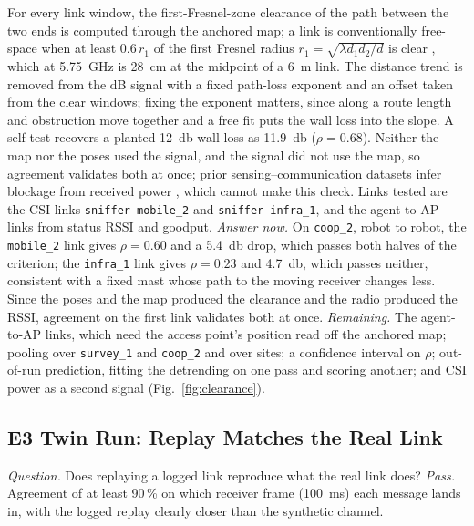 \documentclass[journal]{IEEEtran}
\begin{document}
For every link window, the first-Fresnel-zone clearance of the path
between the two ends is computed through the anchored map; a link is
conventionally free-space when at least $0.6\,r_1$ of the first
Fresnel radius $r_1 = \sqrt{\lambda d_1 d_2 / d}$ is clear
\cite{itup530}, which at \SI{5.75}{\giga\hertz} is \SI{28}{\centi\metre}
at the midpoint of a \SI{6}{\metre} link. The distance trend is
removed from the dB signal with a fixed path-loss exponent and an
offset taken from the clear windows; fixing the exponent matters,
since along a route length and obstruction move together and a free
fit puts the wall loss into the slope. A self-test recovers a planted
\SI{12}{\decibel} wall loss as \SI{11.9}{\decibel} ($\rho = 0.68$).
Neither the map nor the poses used the signal, and the signal did not
use the map, so agreement validates both at once; prior
sensing--communication datasets infer blockage from received power
\cite{deepsense6g}, which cannot make this check. Links tested are
the CSI links \texttt{sniffer}--\texttt{mobile\_2} and
\texttt{sniffer}--\texttt{infra\_1}, and the agent-to-AP links from
status RSSI and goodput. \emph{Answer now.} On \texttt{coop\_2}, robot to robot, the
\texttt{mobile\_2} link gives $\rho = 0.60$ and a
\SI{5.4}{\decibel} drop, which passes both halves of the criterion;
the \texttt{infra\_1} link gives $\rho = 0.23$ and
\SI{4.7}{\decibel}, which passes neither, consistent with a fixed
mast whose path to the moving receiver changes less. Since the poses
and the map produced the clearance and the radio produced the RSSI,
agreement on the first link validates both at once.
\emph{Remaining.} The agent-to-AP links, which need the access
point's position read off the anchored map; pooling over
\texttt{survey\_1} and \texttt{coop\_2} and over sites; a
confidence interval on $\rho$; out-of-run prediction, fitting the
detrending on one pass and scoring another; and CSI power as a second
signal (Fig.~\ref{fig:clearance}).





\subsection{E3 Twin Run: Replay Matches the Real Link}
\emph{Question.} Does replaying a logged link reproduce what the real
link does? \emph{Pass.} Agreement of at least 90\,\% on which receiver
frame (\SI{100}{\milli\second}) each message lands in, with the logged
replay clearly closer than the synthetic channel.
\end{document}
